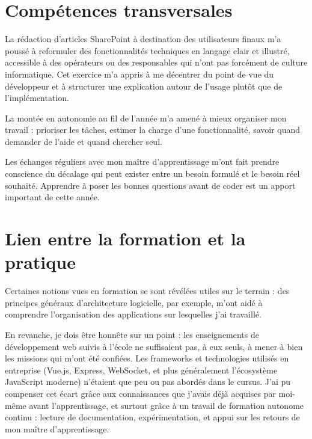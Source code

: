 \documentclass[pe1a]{tnreport} %
\begin{document}
\section{Compétences transversales}

La rédaction d'articles SharePoint à destination des utilisateurs finaux 
m'a poussé à reformuler des fonctionnalités techniques en langage clair et 
illustré, accessible à des opérateurs ou des responsables qui n'ont pas forcément de 
culture informatique. Cet exercice m'a appris à me décentrer du point de vue 
du développeur et à structurer une explication autour de l'usage plutôt 
que de l'implémentation.

La montée en autonomie au fil de l'année m'a amené à mieux organiser mon 
travail : prioriser les tâches, estimer la charge d'une fonctionnalité, 
savoir quand demander de l'aide et quand chercher seul.

Les échanges réguliers avec mon maître d'apprentissage m'ont fait prendre 
conscience du décalage qui peut exister entre un besoin formulé et le besoin 
réel souhaité. Apprendre à poser les bonnes questions avant de coder est 
un apport important de cette année.

\section{Lien entre la formation et la pratique}

Certaines notions vues en formation se sont révélées utiles sur le terrain : 
des principes généraux d'architecture 
logicielle, par exemple, m'ont aidé à comprendre l'organisation des 
applications sur lesquelles j'ai travaillé.

En revanche, je dois être honnête sur un point : les enseignements de 
développement web suivis à l'école ne suffisaient pas, à eux seuls, à mener 
à bien les missions qui m'ont été confiées. Les frameworks et technologies 
utilisés en entreprise (Vue.js, Express, \gls{WebSocket}, et plus généralement 
l'écosystème JavaScript moderne) n'étaient que peu ou pas abordés dans le 
cursus. J'ai pu compenser cet écart grâce aux connaissances que j'avais 
déjà acquises par moi-même avant l'apprentissage, et surtout grâce à un travail 
de formation autonome continu : lecture de documentation, expérimentation, 
et appui sur les retours de mon maître d'apprentissage.
\end{document}
